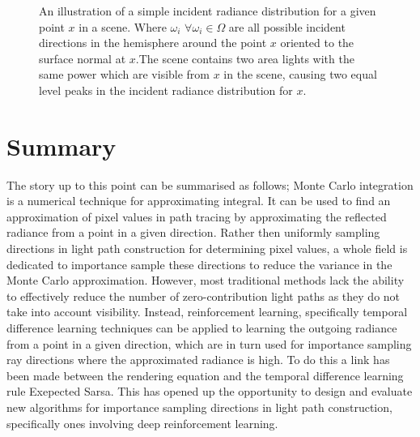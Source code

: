 \documentclass[../dissertation.tex]{subfiles}
\begin{document}
\begin{figure}[h]
\centering
\begin{minipage}{0.4\textwidth}
\end{minipage}
\caption{An illustration of a simple incident radiance distribution for a given point $x$ in a scene. Where $\omega_i$ $\forall \omega_i \in \Omega$ are all possible incident directions in the hemisphere around the point $x$ oriented to the surface normal at $x$.The scene contains two area lights with the same power which are visible from $x$ in the scene, causing two equal level peaks in the incident radiance distribution for $x$.}
  \label{fig:incident_radiance_distributio }
\end{figure}

\section*{Summary}
The story up to this point can be summarised as follows; Monte Carlo integration is a numerical technique for approximating integral. It can be used to find an approximation of pixel values in path tracing by approximating the reflected radiance from a point in a given direction. Rather then uniformly sampling directions in light path construction for determining pixel values, a whole field is dedicated to importance sample these directions to reduce the variance in the Monte Carlo approximation. However, most traditional methods lack the ability to effectively reduce the number of zero-contribution light paths as they do not take into account visibility. Instead, reinforcement learning, specifically temporal difference learning techniques can be applied to learning the outgoing radiance from a point in a given direction, which are in turn used for importance sampling ray directions where the approximated radiance is high. To do this a link has been made between the rendering equation and the temporal difference learning rule Exepected Sarsa. This has opened up the opportunity to design and evaluate new algorithms for importance sampling directions in light path construction, specifically ones involving deep reinforcement learning.
\end{document}
